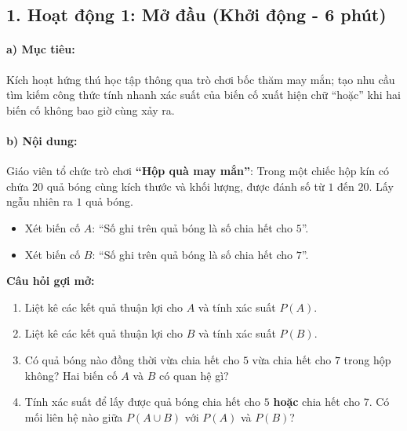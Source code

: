 \documentclass[12pt, a4paper]{article}
\begin{document}
\subsection*{1. Hoạt động 1: Mở đầu (Khởi động - 6 phút)}

\paragraph{a) Mục tiêu:} Kích hoạt hứng thú học tập thông qua trò chơi bốc thăm may mắn; tạo nhu cầu tìm kiếm công thức tính nhanh xác suất của biến cố xuất hiện chữ ``hoặc'' khi hai biến cố không bao giờ cùng xảy ra.

\paragraph{b) Nội dung:} Giáo viên tổ chức trò chơi \textbf{``Hộp quà may mắn''}: Trong một chiếc hộp kín có chứa $20$ quả bóng cùng kích thước và khối lượng, được đánh số từ $1$ đến $20$. Lấy ngẫu nhiên ra $1$ quả bóng.
\begin{itemize}[leftmargin=0.6cm]
    \item Xét biến cố $A$: ``Số ghi trên quả bóng là số chia hết cho $5$''.
    \item Xét biến cố $B$: ``Số ghi trên quả bóng là số chia hết cho $7$''.
\end{itemize}
\textbf{Câu hỏi gợi mở:}
\begin{enumerate}[leftmargin=0.6cm]
    \item Liệt kê các kết quả thuận lợi cho $A$ và tính xác suất $P(A)$.
    \item Liệt kê các kết quả thuận lợi cho $B$ và tính xác suất $P(B)$.
    \item Có quả bóng nào đồng thời vừa chia hết cho $5$ vừa chia hết cho $7$ trong hộp không? Hai biến cố $A$ và $B$ có quan hệ gì?
    \item Tính xác suất để lấy được quả bóng chia hết cho $5$ \textbf{hoặc} chia hết cho $7$. Có mối liên hệ nào giữa $P(A \cup B)$ với $P(A)$ và $P(B)$?
\end{enumerate}
\end{document}
